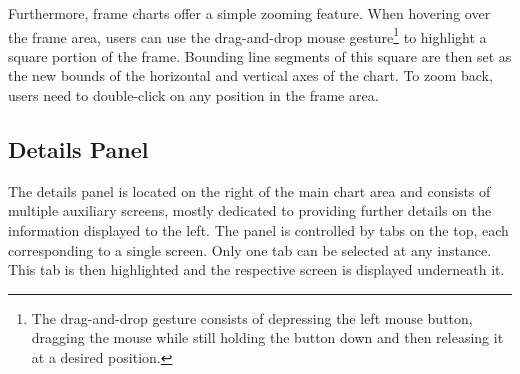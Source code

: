 Furthermore, frame charts offer a simple zooming feature. When hovering over the frame area, users can use the drag-and-drop mouse gesture\footnote{The drag-and-drop gesture consists of depressing the left mouse button, dragging the mouse while still holding the button down and then releasing it at a desired position.} to highlight a square portion of the frame. Bounding line segments of this square are then set as the new bounds of the horizontal and vertical axes of the chart. To zoom back, users need to double-click on any position in the frame area.

\subsection{Details Panel}
The details panel is located on the right of the main chart area and consists of multiple auxiliary screens, mostly dedicated to providing further details on the information displayed to the left. The panel is controlled by tabs on the top, each corresponding to a single screen. Only one tab can be selected at any instance. This tab is then highlighted and the respective screen is displayed underneath it.


